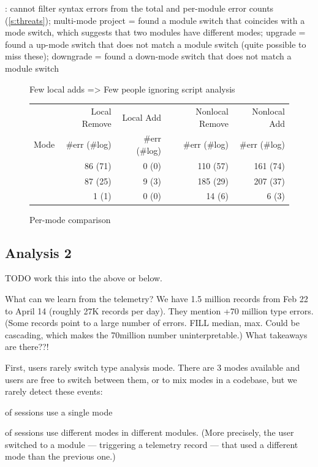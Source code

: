\documentclass[english,submission,cleveref]{programming}
\begin{document}
:
cannot filter syntax errors from the total and per-module error counts (\cref{s:threats});
multi-mode project = found a module switch that coincides with a mode switch, which suggests that two modules have different modes;
upgrade = found a up-mode switch that does not match a module switch (quite possible to miss these);
downgrade = found a down-mode switch that does not match a module switch

\begin{figure}[t]

  {Few local adds => Few people ignoring script analysis}
  \smallskip

  \begin{tabular}{lrrrr}
    & Local Remove & Local Add & Nonlocal Remove & Nonlocal Add \\
    Mode
    & \#err (\#log)
    & \#err (\#log)
    & \#err (\#log)
    & \#err (\#log) \\\midrule
    \mnocheck{}   & 86 (71) & 0 (0) & 110 (57) & 161 (74) \\
    \mnonstrict{} & 87 (25) & 9 (3) & 185 (29) & 207 (37) \\
    \mstrict{}    &  1  (1) & 0 (0) &  14  (6) &   6  (3) \\
  \end{tabular}

  \caption{Per-mode comparison}
  \label{f:mode-errors}
\end{figure}

\subsection{Analysis 2}

TODO work this into the above or below.

What can we learn from the telemetry? We have 1.5 million records from Feb 22
to April 14 (roughly 27K records per day).
They mention +70 million type errors.
(Some records point to a large number of errors. FILL median, max. Could be cascading,
which makes the 70million number uninterpretable.)
What takeaways are there??!

First,
users rarely switch type analysis mode. There are 3 modes available and users
are free to switch between them, or to mix modes in a codebase, but we rarely
detect these events:

 of sessions use a single mode

 of sessions use different modes in different modules. (More
precisely, the user switched to a module --- triggering a telemetry record ---
that used a different mode than the previous one.)
\end{document}
